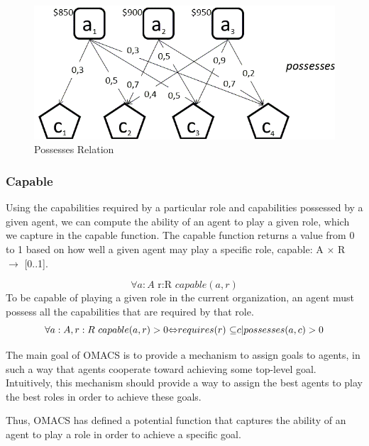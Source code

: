 \begin{figure}[th]
	\centering
		\includegraphics[scale=0.5]{ch1/img/RelPossess}
	\caption{\label{fig:Possesses Relation}Possesses Relation}
\end{figure}


\subsubsection{Capable}
Using the capabilities required by a particular role and capabilities possessed by a given agent, we can compute the ability of an agent to play a given role, which we capture in the capable function. The capable function returns a value from 0 to 1 based on how well a given agent may play a specific role, capable: A $\times$ R $\rightarrow$ {[}0..1{]}\cite{omacs2}.

\begin{equation}
\forall a:A\textrm{ r:R }capable(a,r) \label{eq:Funccapable}
\end{equation} 
To be capable of playing a given role in the current organization,
 an agent must possess all the capabilities that are required by that role\cite{omacs2}.
\begin{equation}
\text{\ensuremath{\forall}}a:A,r:R\text{  }capable(a,r) > 0  \text{\ensuremath{\Leftrightarrow}} requires(r)\text{ \ensuremath{\subseteq}}{ c | possesses(a,c) > 0 }\label{eq:FuncCapable2}
\end{equation}

The main goal of OMACS is to provide a mechanism to assign goals to agents\cite{omacs2}, 
in such a way that agents cooperate toward achieving some top-level goal.
Intuitively, this mechanism should provide a way to assign the best agents 
to play the best roles in order to achieve these goals. 

Thus, OMACS has defined a potential function that captures the ability of an agent 
to play a role in order to achieve a specific goal\cite{omacs2}.


